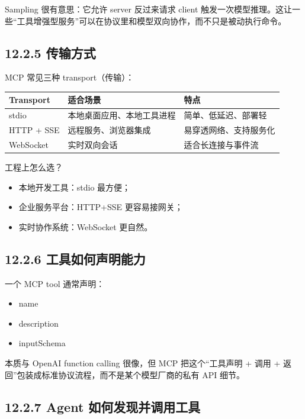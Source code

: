 Sampling 很有意思：它允许 server 反过来请求 client 触发一次模型推理。这让一些``工具增强型服务''可以在协议里和模型双向协作，而不只是被动执行命令。


\subsection{12.2.5 传输方式}

MCP 常见三种 transport（传输）：


\begingroup
\scriptsize
\setlength{\tabcolsep}{3pt}
\begin{longtable}{|p{}|p{}|p{}|}
\hline
Transport & 适合场景 & 特点 \\ \hline
stdio & 本地桌面应用、本地工具进程 & 简单、低延迟、部署轻 \\ \hline
HTTP + SSE & 远程服务、浏览器集成 & 易穿透网络、支持服务化 \\ \hline
WebSocket & 实时双向会话 & 适合长连接与事件流 \\ \hline
\end{longtable}
\endgroup

工程上怎么选？


\begin{itemize}[leftmargin=2em]
\item 本地开发工具：stdio 最方便；
\item 企业服务平台：HTTP+SSE 更容易接网关；
\item 实时协作系统：WebSocket 更自然。
\end{itemize}

\subsection{12.2.6 工具如何声明能力}

一个 MCP tool 通常声明：


\begin{itemize}[leftmargin=2em]
\item name
\item description
\item inputSchema
\end{itemize}

本质与 OpenAI function calling 很像，但 MCP 把这个``工具声明 + 调用 + 返回''包装成标准协议流程，而不是某个模型厂商的私有 API 细节。


\subsection{12.2.7 Agent 如何发现并调用工具}


